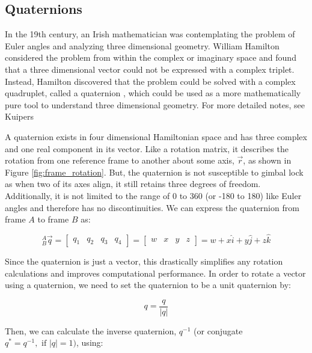 \subsection{Quaternions} \label{ssec:quaternions}
In the 19th century, an Irish mathematician was contemplating the problem of Euler angles and analyzing three dimensional geometry.
William Hamilton considered the problem from within the complex or imaginary space and found that a three dimensional vector could not be expressed with a complex triplet.
Instead, Hamilton discovered that the problem could be solved with a complex quadruplet, called a quaternion \cite{Hamilton:1850}, which could be used as a more mathematically pure tool to understand three dimensional geometry.
For more detailed notes, see Kuipers \cite{Kuipers:2002}

A quaternion exists in four dimensional Hamiltonian space and has three complex and one real component in its vector. 
Like a rotation matrix, it describes the rotation from one reference frame to another about some axis, $\vec{r}$, as shown in Figure \ref{fig:frame_rotation}.
But, the quaternion is not susceptible to gimbal lock as when two of its axes align, it still retains three degrees of freedom.
Additionally, it is not limited to the range of 0 to 360 (or -180 to 180) like Euler angles and therefore has no discontinuities.
We can express the quaternion from frame $A$ to frame $B$ as:

\begin{equation}
    {}^A_B \vec{q} = \left[
        \begin{matrix}
            q_1 & q_2 & q_3 & q_4
        \end{matrix}
    \right] = 
    \left[
        \begin{matrix}
            w & x & y & z
        \end{matrix}
    \right] = 
    w + x\hat{i} + y\hat{j} + z\hat{k}
\end{equation}

Since the quaternion is just a vector, this drastically simplifies any rotation calculations and improves computational performance.
In order to rotate a vector using a quaternion, we need to set the quaternion to be a unit quaternion by:

\begin{equation}
    q = \frac{q}{|q|}
\end{equation}

Then, we can calculate the inverse quaternion, ${q}^{-1}$ (or conjugate $q^*=q^{-1}, \text{ if } |q|=1)$, using:

